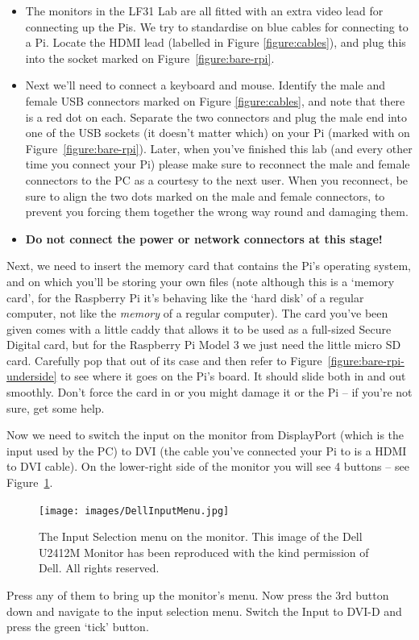 \begin{itemize}
\item The monitors in the LF31 Lab are all fitted with an extra video lead for connecting up the Pis. We try to standardise on blue cables for connecting to a Pi. Locate the HDMI lead (labelled \protect{} in Figure \ref{figure:cables}), and plug this into the socket marked  on Figure~\ref{figure:bare-rpi}.
\item Next we'll need to connect a keyboard and mouse. Identify the male and female USB connectors marked \protect{} on Figure \ref{figure:cables}, and note that there is a red dot on each. Separate the two connectors and plug the male end into one of the USB sockets (it doesn't matter which) on your Pi (marked with \protect{} on Figure~\ref{figure:bare-rpi}). Later, when you've finished this lab (and every other time you connect your Pi) please make sure to reconnect the male and female connectors to the PC as a courtesy to the next user. When you reconnect, be sure to align the two dots marked on the male and female connectors, to prevent you forcing them together the wrong way round and damaging them.
\item \textbf{Do not connect the power or network connectors at this stage!}
\end{itemize}

Next, we need to insert the memory card that contains the Pi's operating system, and on which you'll be storing your own files (note although this is a `memory card', for the Raspberry Pi it's behaving like the `hard disk' of a regular computer, not like the \textit{memory} of a regular computer). The card you've been given comes with a little caddy that allows it to be used as a full-sized Secure Digital card, but for the Raspberry Pi Model 3 we just need the little micro SD card. Carefully pop that out of its case and then refer to Figure~\ref{figure:bare-rpi-underside} to see where it goes on the Pi's board. It should slide both in and out smoothly. Don't force the card in or you might damage it or the Pi -- if you're not sure, get some help.

Now we need to switch the input on the monitor from DisplayPort (which
is the input used by the PC) to DVI (the cable you've
connected your Pi to is a HDMI to DVI cable). On the lower-right side
of the monitor you will see 4 buttons -- see
Figure~\ref{figure:monitorswitch}. 
%
\begin{figure}
\centerline{\texttt{[image: images/DellInputMenu.jpg]}}
\caption{The Input Selection menu on the monitor. This image of the Dell U2412M Monitor has been reproduced with the kind permission of Dell. All rights reserved.}\label{figure:monitorswitch}
\end{figure}
%
Press any of them to bring up the
monitor's menu. Now press the 3rd button down and navigate to the
input selection menu. Switch the Input to DVI-D and press the green `tick' button.

